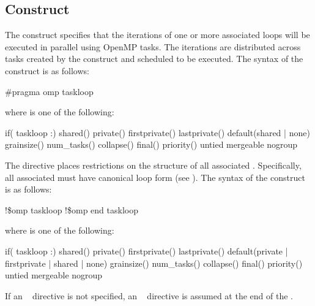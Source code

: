 \subsection{ Construct}
\label{subsec:taskloop Construct}
\summary
The  construct specifies that the iterations of one or more associated loops will be executed in parallel using OpenMP tasks. The iterations are distributed across tasks created by the construct and scheduled to be executed.
\syntax
\ccppspecificstart
The syntax of the  construct is as follows:
\begin{boxedcode}
\#pragma omp taskloop 
\end{boxedcode}
where  is one of the following:
\begin{indentedcodelist}
if(\plc{[} taskloop :\plc{] scalar-expr})
shared()
private()
firstprivate()
lastprivate()
default(shared \textnormal{|} none)
grainsize()
num_tasks()
collapse()
final()
priority()
untied
mergeable
nogroup
\end{indentedcodelist}

The  directive places restrictions on the structure of all associated . Specifically, all associated  must have canonical loop form (see ).
\ccppspecificend
\fortranspecificstart
The syntax of the  construct is as follows:
\begin{boxedcode}
!\$omp taskloop 
\plc{[}!\$omp end taskloop\plc{]}
\end{boxedcode}
where  is one of the following:
\begin{indentedcodelist}
if(\plc{[} taskloop :\plc{] scalar-logical-expr})
shared()
private()
firstprivate()
lastprivate()
default(private \textnormal{|} firstprivate \textnormal{|} shared \textnormal{|} none)
grainsize()
num_tasks()
collapse()
final()
priority()
untied
mergeable
nogroup
\end{indentedcodelist}

If an ~ directive is not specified, an 
~ directive is assumed at the end of the 
.

